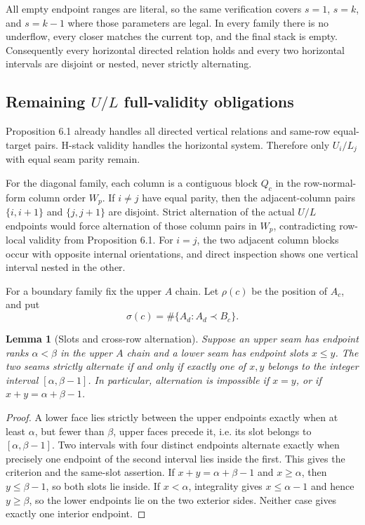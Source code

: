 \documentclass[11pt]{article}
\newtheorem{lemma}[theorem]{Lemma}
\theoremstyle{definition}
\theoremstyle{remark}
\begin{document}
All empty endpoint ranges are literal, so the same verification covers
\(s=1\), \(s=k\), and \(s=k-1\) where those parameters are legal. In
every family there is no underflow, every closer matches the current
top, and the final stack is empty. Consequently every horizontal
directed relation holds and every two horizontal intervals are disjoint
or nested, never strictly alternating.

\subsection{\texorpdfstring{Remaining \(U/L\) full-validity
obligations}{Remaining U/L full-validity obligations}}\label{d.5.-remaining-ul-full-validity-obligations}

Proposition 6.1 already handles all directed vertical relations and
same-row equal-target pairs. H-stack validity handles the horizontal
system. Therefore only $U_i/L_j$ with equal seam parity remain.

For the diagonal family, each column is a contiguous block $Q_c$ in
the row-normal-form column order $W_p$. If $i\ne j$ have equal parity,
then the adjacent-column pairs $\{i,i+1\}$ and $\{j,j+1\}$ are disjoint.
Strict alternation of the actual $U/L$ endpoints would force alternation
of those column pairs in $W_p$, contradicting row-local validity from
Proposition 6.1. For $i=j$, the two adjacent column blocks occur with
opposite internal orientations, and direct inspection shows one vertical
interval nested in the other.

For a boundary family fix the upper $A$ chain. Let $\rho(c)$ be the
position of $A_c$, and put
\[
\sigma(c)=\#\{A_d:A_d\prec B_c\}.
\]

\begin{lemma}[Slots and cross-row alternation]\label{lem:per2-slots}
Suppose an upper seam has endpoint ranks $\alpha<\beta$ in the upper
$A$ chain and a lower seam has endpoint slots $x\le y$. The two seams
strictly alternate if and only if exactly one of $x,y$ belongs to the
integer interval $[\alpha,\beta-1]$. In particular, alternation is
impossible if $x=y$, or if $x+y=\alpha+\beta-1$.
\end{lemma}
\begin{proof}
A lower face lies strictly between the upper endpoints exactly when at
least $\alpha$, but fewer than $\beta$, upper faces precede it, i.e. its
slot belongs to $[\alpha,\beta-1]$. Two intervals with four distinct
endpoints alternate exactly when precisely one endpoint of the second
interval lies inside the first. This gives the criterion and the same-slot
assertion. If $x+y=\alpha+\beta-1$ and $x\ge\alpha$, then
$y\le\beta-1$, so both slots lie inside. If $x<\alpha$, integrality gives
$x\le\alpha-1$ and hence $y\ge\beta$, so the lower endpoints lie on the
two exterior sides. Neither case gives exactly one interior endpoint.
\end{proof}
\end{document}
